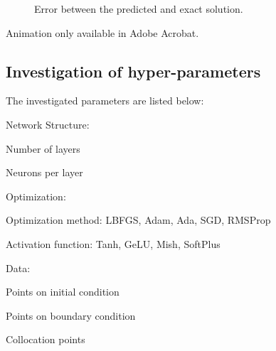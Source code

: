\documentclass[10pt, a4paper]{article}
\begin{document}
\begin{figure}[th]
    \caption{Error between the predicted and exact solution.}
    \label{fig:error}
\end{figure}


\begin{center}
\end{center}
\begin{center}
    Animation only available in Adobe Acrobat.
\end{center}

\newpage
\subsection{Investigation of hyper-parameters}

The investigated parameters are listed below:
\begin{compactenum}
    \item [Network Structure:]~
    \begin{compactenum}
        \item Number of layers
        \item Neurons per layer 
    \end{compactenum}
    \item [Optimization:]~
    \begin{compactenum}
        \item Optimization method: LBFGS, Adam, Ada, SGD, RMSProp
        \item Activation function: Tanh, GeLU, Mish, SoftPlus
    \end{compactenum}
    \item[Data:]~
    \begin{compactenum}
        \item Points on initial condition
        \item Points on boundary condition
        \item Collocation points
    \end{compactenum}
\end{compactenum}
\end{document}
